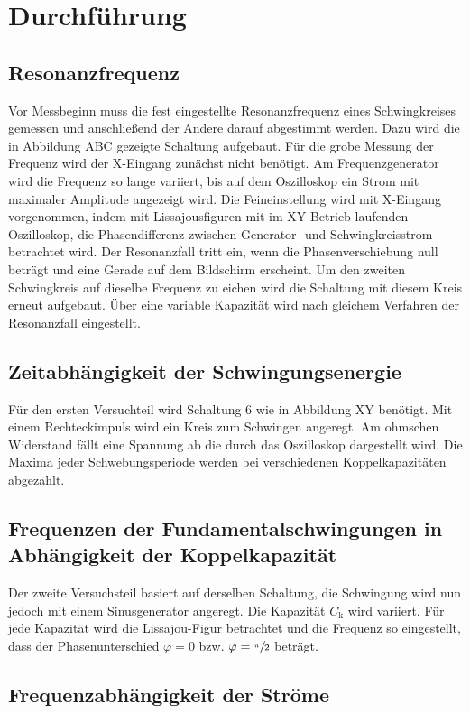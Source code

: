 \section{Durchführung}
\label{sec:Durchfuehrung}
\subsection{Resonanzfrequenz}
Vor Messbeginn muss die fest eingestellte Resonanzfrequenz eines Schwingkreises gemessen und anschließend der Andere darauf abgestimmt werden. Dazu wird die in Abbildung ABC gezeigte Schaltung aufgebaut. Für die grobe Messung der Frequenz wird der X-Eingang zunächst nicht benötigt. Am Frequenzgenerator wird die Frequenz so lange variiert, bis auf dem Oszilloskop ein Strom mit maximaler Amplitude angezeigt wird. Die Feineinstellung wird mit X-Eingang vorgenommen, indem mit Lissajousfiguren mit im XY-Betrieb laufenden Oszilloskop, die Phasendifferenz zwischen Generator- und Schwingkreisstrom betrachtet wird.  Der Resonanzfall tritt ein, wenn die Phasenverschiebung null beträgt und eine Gerade auf dem Bildschirm erscheint.
Um den zweiten Schwingkreis auf dieselbe Frequenz zu eichen wird die Schaltung mit diesem Kreis erneut aufgebaut. Über eine variable Kapazität wird nach gleichem Verfahren der Resonanzfall eingestellt.

\subsection{Zeitabhängigkeit der Schwingungsenergie}

Für den ersten Versuchteil wird Schaltung 6 wie in Abbildung XY benötigt. Mit einem Rechteckimpuls wird ein Kreis zum Schwingen angeregt. Am ohmschen Widerstand fällt eine Spannung ab die durch das Oszilloskop dargestellt wird. Die Maxima jeder Schwebungsperiode werden bei verschiedenen Koppelkapazitäten abgezählt.

\subsection{Frequenzen der Fundamentalschwingungen in Abhängigkeit der Koppelkapazität}
Der zweite Versuchsteil basiert auf derselben Schaltung, die Schwingung wird nun jedoch mit einem Sinusgenerator angeregt.
Die Kapazität $C_\mathup{k}$ wird variiert. Für jede Kapazität wird die Lissajou-Figur betrachtet und die Frequenz so eingestellt, dass der Phasenunterschied $\varphi=0$ bzw. $\varphi=\sfrac{\pi}{2}$ beträgt.

\subsection{Frequenzabhängigkeit der Ströme}


